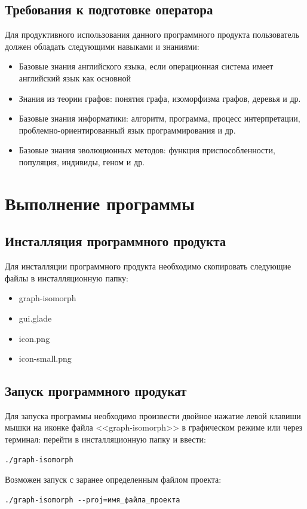 \documentclass[russian,utf8,emptystyle]{eskdtext}
\begin{document}
\subsection{Требования к подготовке оператора}
Для продуктивного использования данного программного продукта пользователь должен обладать следующими навыками и знаниями:
\begin{itemize}
\item Базовые знания английского языка, если операционная система имеет английский язык как основной
\item Знания из теории графов: понятия графа, изоморфизма графов, деревья и др.
\item Базовые знания информатики: алгоритм, программа, процесс интерпретации, проблемно-ориентированный язык программирования и др.
\item Базовые знания эволюционных методов: функция приспособленности, популяция, индивиды, геном и др.
\end{itemize}

\section{Выполнение программы}
\subsection{Инсталляция программного продукта}
Для инсталляции программного продукта необходимо скопировать следующие файлы в инсталляционную папку:
\begin{itemize}
\item graph-isomorph
\item gui.glade
\item icon.png
\item icon-small.png
\end{itemize}

\subsection{Запуск программного продукат}
Для запуска программы необходимо произвести двойное нажатие левой клавиши мышки на иконке файла <<graph-isomorph>> в графическом режиме или через терминал: перейти в инсталляционную папку и ввести:
\begin{verbatim}
./graph-isomorph
\end{verbatim} 

Возможен запуск с заранее определенным файлом проекта: 
\begin{verbatim}
./graph-isomorph --proj=имя_файла_проекта
\end{verbatim}
\end{document}
